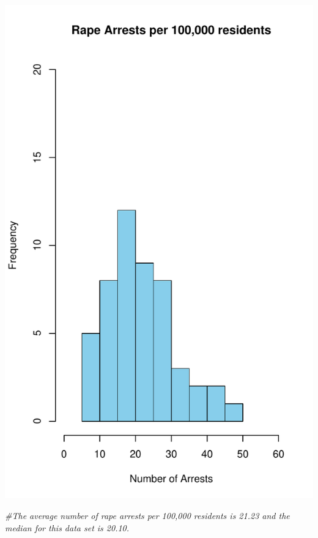 \documentclass[
]{article}
\newenvironment{Shaded}{\begin{snugshade}}{\end{snugshade}}
\newcommand{\CommentTok}[1]{\textcolor[rgb]{0.56,0.35,0.01}{\textit{#1}}}
\begin{document}
\includegraphics{Assignments_files/figure-latex/unnamed-chunk-8-1.pdf}

\begin{Shaded}
\begin{Highlighting}[]
\CommentTok{\#The average number of rape arrests per 100,000 residents is 21.23 and the median for this data set is 20.10.  }
\end{Highlighting}
\end{Shaded}
\end{document}
